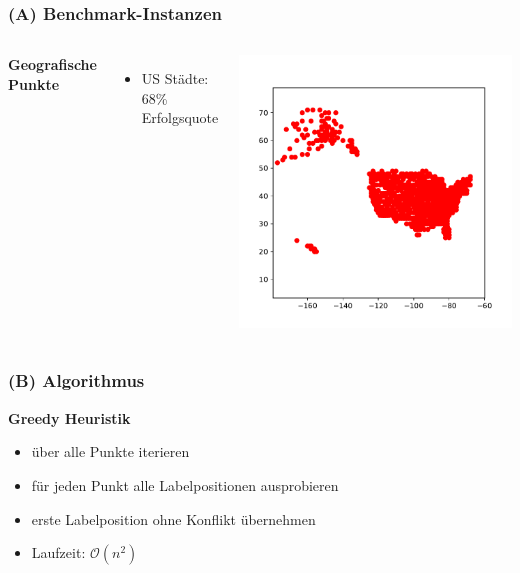 \documentclass[aspectratio=169]{beamer}
\begin{document}
\begin{frame}
	\frametitle{(A) Benchmark-Instanzen}
	\begin{columns}[c] %
	
	\textbf{Geografische Punkte}
	\begin{itemize}
		\item US Städte: 68\% Erfolgsquote
	\end{itemize}
	
	\includegraphics[scale=.5]{cities.pdf}
	

	\end{columns}
	\end{frame}



\begin{frame}
\frametitle{(B) Algorithmus}
	
\textbf{Greedy Heuristik}
\begin{itemize}
	\item über alle Punkte iterieren
	\item für jeden Punkt alle Labelpositionen ausprobieren
	\item erste Labelposition ohne Konflikt übernehmen
	\item Laufzeit: $\mathcal{O}(n^2)$
\end{itemize}
	

\end{frame}

\end{document}
